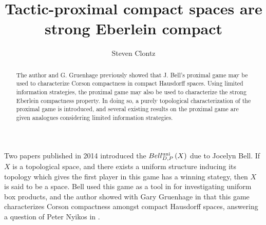 \documentclass{amsart}
\theoremstyle{definition}
\begin{document}
\title{Tactic-proximal compact spaces are strong Eberlein compact}




\author{Steven Clontz}
\address{Department of Mathematics, Auburn University,
Auburn, AL 36830}




\begin{abstract}
  The author and G. Gruenhage previously showed that J. Bell's proximal game
  may be used to characterize Corson compactness in compact Hausdorff spaces.
  Using limited information strategies, the proximal game may also be
  used to characterize the strong Eberlein compactness property.
  In doing so, a purely topological characterization of the proximal game
  is introduced, and several existing results on
  the proximal game are given
  analogues considering limited information strategies.
\end{abstract}


\maketitle

  Two papers published in 2014 introduced the
  \(Bell_{D,P}^{\textrm{uni}}\left({X}\right)\) due to Jocelyn Bell. If \(X\) is a
  topological space, and there exists a uniform structure inducing its topology
  which gives the first player in this game has a winning stategy,
  then \(X\) is said to be a  space. Bell used this
  game as a tool in \cite{MR3239205} for investigating uniform box products,
  and the author showed with Gary Gruenhage in \cite{MR3227201} that
  this game characterizes Corson compactness amongst compact Hausdorff spaces,
  answering a question of Peter Nyikos in \cite{nyikosProximalPreprint}.
\end{document}
